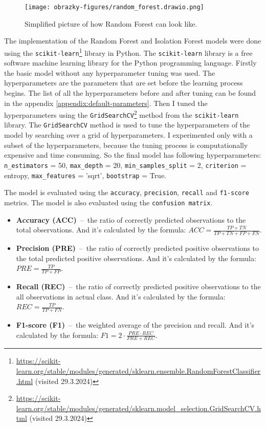 \begin{figure}
    \centering
    \texttt{[image: obrazky-figures/random\_forest.drawio.png]}
    \caption{Simplified picture of how Random Forest can look like.}
    \label{fig:random_forest}
\end{figure}

The implementation of the Random Forest and Isolation Forest models were done using the \texttt{scikit-learn}\footnote[1]{\url{https://scikit-learn.org/stable/modules/generated/sklearn.ensemble.RandomForestClassifier.html} (visited 29.3.2024)} library in Python. 
The \texttt{scikit-learn} library is a free software machine learning library for the Python programming language.
Firstly the basic model without any hyperparameter tuning was used. The hyperparameters are the parameters that are set before the learning process begins.
The list of all the hyperparameters before and after tuning can be found in the appendix \ref{appendix:default-parameters}. 
Then I tuned the hyperparameters using the \texttt{GridSearchCV}\footnote{\url{https://scikit-learn.org/stable/modules/generated/sklearn.model_selection.GridSearchCV.html} (visited 29.3.2024)} method from the \texttt{scikit-learn} library. The \texttt{GridSearchCV} method is used to tune the hyperparameters of the model by searching over a grid of hyperparameters.
I experimented only with a subset of the hyperparameters, because the tuning process is computationally expensive and time consuming. 
So the final model has following hyperparameters: 
\texttt{n\_estimators} = 50, \texttt{max\_depth} = 20, \texttt{min\_samples\_split} = 2, \texttt{criterion} = entropy, \texttt{max\_features} = 'sqrt', \texttt{bootstrap} = True.


The model is evaluated using the \texttt{accuracy}, \texttt{precision}, \texttt{recall} and \texttt{f1-score} metrics. The model is also evaluated using the \texttt{confusion matrix}.
\begin{itemize}
    \item \textbf{Accuracy (ACC)}  \,--\, the ratio of correctly predicted observations to the total observations. And it's calculated by the formula: $ACC = \frac{TP + TN}{TP + TN + FP + FN}$.
    \item \textbf{Precision (PRE)} \,--\, the ratio of correctly predicted positive observations to the total predicted positive observations. And it's calculated by the formula: $PRE = \frac{TP}{TP + FP}$.
    \item \textbf{Recall (REC)} \,--\, the ratio of correctly predicted positive observations to the all observations in actual class. And it's calculated by the formula: $REC = \frac{TP}{TP + FN}$.
    \item \textbf{F1-score (F1)} \,--\, the weighted average of the precision and recall. And it's calculated by the formula: $F1 = 2 \cdot \frac{PRE \cdot REC}{PRE + REC}$.
\end{itemize}


